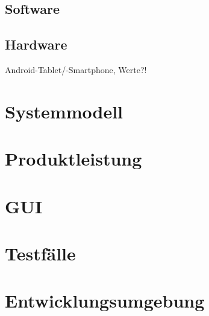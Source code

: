 \documentclass[a4paper,10pt]{article}
\begin{document}
\subsection{Software}

\subsection{Hardware}
Android-Tablet/-Smartphone, Werte?!
\section{Systemmodell}

\section{Produktleistung}

\section{GUI}

\section{Testfälle}

\section{Entwicklungsumgebung}

\clearpage

\end{document}
